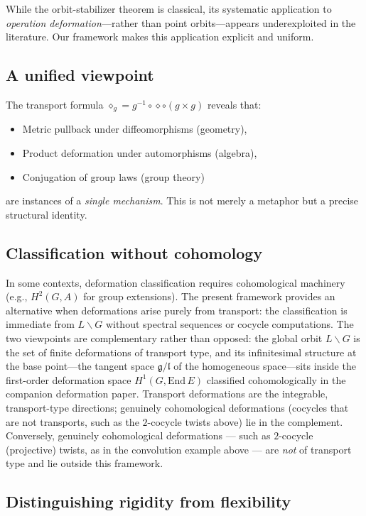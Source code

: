 \documentclass[11pt,a4paper]{article}
\begin{document}
	While the orbit-stabilizer theorem is classical, its systematic application to \emph{operation deformation}—rather than point orbits—appears underexploited in the literature. Our framework makes this application explicit and uniform.
	
	\subsection*{A unified viewpoint}
	
	The transport formula $\diamond_g = g^{-1} \circ \diamond \circ (g \times g)$ reveals that:
	\begin{itemize}
		\item Metric pullback under diffeomorphisms (geometry),
		\item Product deformation under automorphisms (algebra),
		\item Conjugation of group laws (group theory)
	\end{itemize}
	are instances of a \emph{single mechanism}. This is not merely a metaphor but a precise structural identity.
	
	\subsection*{Classification without cohomology}
	
	In some contexts, deformation classification requires cohomological machinery (e.g., $H^2(G, A)$ for group extensions). The present framework provides an alternative when deformations arise purely from transport: the classification is immediate from $L\backslash G$ without spectral sequences or cocycle computations. The two
viewpoints are complementary rather than opposed: the global orbit $L\backslash G$ is the set of finite
deformations of transport type, and its infinitesimal structure at the base point---the tangent space
$\mathfrak g/\mathfrak l$ of the homogeneous space---sits inside the first-order deformation space
$H^1(G,\mathrm{End}\,E)$ classified cohomologically in the companion deformation paper. Transport deformations
are the integrable, transport-type directions; genuinely cohomological deformations (cocycles that are not
transports, such as the $2$-cocycle twists above) lie in the complement. Conversely, genuinely cohomological deformations --- such as $2$-cocycle (projective) twists, as in the convolution example above --- are \emph{not} of transport type and lie outside this framework.
	
	\subsection*{Distinguishing rigidity from flexibility}
	
\end{document}
